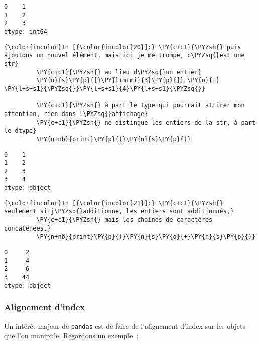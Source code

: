     \begin{Verbatim}[commandchars=\\\{\}]
0    1
1    2
2    3
dtype: int64

    \end{Verbatim}

    \begin{Verbatim}[commandchars=\\\{\}]
{\color{incolor}In [{\color{incolor}20}]:} \PY{c+c1}{\PYZsh{} puis ajoutons un nouvel élément, mais ici je me trompe, c\PYZsq{}est une str}
         \PY{c+c1}{\PYZsh{} au lieu d\PYZsq{}un entier}
         \PY{n}{s}\PY{p}{[}\PY{l+m+mi}{3}\PY{p}{]} \PY{o}{=} \PY{l+s+s1}{\PYZsq{}}\PY{l+s+s1}{4}\PY{l+s+s1}{\PYZsq{}}
         
         \PY{c+c1}{\PYZsh{} à part le type qui pourrait attirer mon attention, rien dans l\PYZsq{}affichage}
         \PY{c+c1}{\PYZsh{} ne distingue les entiers de la str, à part le dtype}
         \PY{n+nb}{print}\PY{p}{(}\PY{n}{s}\PY{p}{)}
\end{Verbatim}


    \begin{Verbatim}[commandchars=\\\{\}]
0    1
1    2
2    3
3    4
dtype: object

    \end{Verbatim}

    \begin{Verbatim}[commandchars=\\\{\}]
{\color{incolor}In [{\color{incolor}21}]:} \PY{c+c1}{\PYZsh{} seulement si j\PYZsq{}additionne, les entiers sont additionnés,}
         \PY{c+c1}{\PYZsh{} mais les chaînes de caractères concaténées.}
         \PY{n+nb}{print}\PY{p}{(}\PY{n}{s}\PY{o}{+}\PY{n}{s}\PY{p}{)}
\end{Verbatim}


    \begin{Verbatim}[commandchars=\\\{\}]
0     2
1     4
2     6
3    44
dtype: object

    \end{Verbatim}

    \hypertarget{alignement-dindex}{%
\subsubsection{Alignement d'index}\label{alignement-dindex}}

    Un intérêt majeur de \texttt{pandas} est de faire de l'alignement
d'index sur les objets que l'on manipule. Regardons un exemple~:

